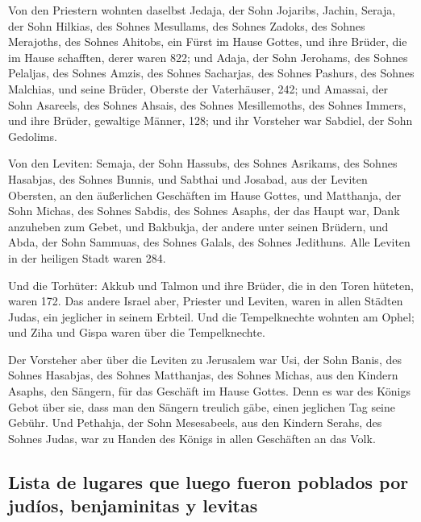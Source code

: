  Von den Priestern wohnten daselbst Jedaja, der Sohn
Jojaribs, Jachin,  Seraja, der Sohn Hilkias, des Sohnes
Mesullams, des Sohnes Zadoks, des Sohnes Merajoths, des Sohnes Ahitobs,
ein Fürst im Hause Gottes,  und ihre Brüder, die im Hause
schafften, derer waren 822; und Adaja, der Sohn Jerohams, des Sohnes
Pelaljas, des Sohnes Amzis, des Sohnes Sacharjas, des Sohnes Pashurs,
des Sohnes Malchias,  und seine Brüder, Oberste der
Vaterhäuser, 242; und Amassai, der Sohn Asareels, des Sohnes Ahsais, des
Sohnes Mesillemoths, des Sohnes Immers,  und ihre Brüder,
gewaltige Männer, 128; und ihr Vorsteher war Sabdiel, der Sohn Gedolims.

 Von den Leviten: Semaja, der Sohn Hassubs, des Sohnes
Asrikams, des Sohnes Hasabjas, des Sohnes Bunnis,  und
Sabthai und Josabad, aus der Leviten Obersten, an den äußerlichen
Geschäften im Hause Gottes,  und Matthanja, der Sohn
Michas, des Sohnes Sabdis, des Sohnes Asaphs, der das Haupt war, Dank
anzuheben zum Gebet, und Bakbukja, der andere unter seinen Brüdern, und
Abda, der Sohn Sammuas, des Sohnes Galals, des Sohnes Jedithuns.
 Alle Leviten in der heiligen Stadt waren 284.

 Und die Torhüter: Akkub und Talmon und ihre Brüder, die
in den Toren hüteten, waren 172.  Das andere Israel aber,
Priester und Leviten, waren in allen Städten Judas, ein jeglicher in
seinem Erbteil.  Und die Tempelknechte wohnten am Ophel;
und Ziha und Gispa waren über die Tempelknechte.

 Der Vorsteher aber über die Leviten zu Jerusalem war
Usi, der Sohn Banis, des Sohnes Hasabjas, des Sohnes Matthanjas, des
Sohnes Michas, aus den Kindern Asaphs, den Sängern, für das Geschäft im
Hause Gottes.  Denn es war des Königs Gebot über sie,
dass man den Sängern treulich gäbe, einen jeglichen Tag seine Gebühr.
 Und Pethahja, der Sohn Mesesabeels, aus den Kindern
Serahs, des Sohnes Judas, war zu Handen des Königs in allen Geschäften
an das Volk.

\hypertarget{lista-de-lugares-que-luego-fueron-poblados-por-juduxedos-benjaminitas-y-levitas}{%
\subsection{Lista de lugares que luego fueron poblados por judíos,
benjaminitas y
levitas}\label{lista-de-lugares-que-luego-fueron-poblados-por-juduxedos-benjaminitas-y-levitas}}

